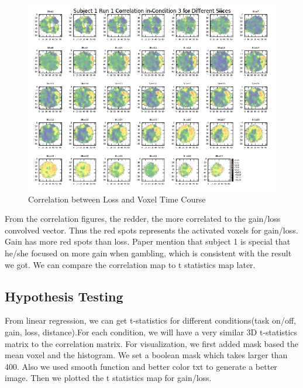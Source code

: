\begin{figure}[H]
    \centering
        \includegraphics[scale=0.5]{../plots/correlation_s1r1c3.png}
    \caption{Correlation between Loss and Voxel Time Course}
\end{figure}
\noindent
From the correlation figures, the redder, the more correlated to the gain/loss convolved vector. Thus the red spots represents the activated voxels for gain/loss. Gain has more red spots than loss. Paper mention that subject 1 is special that he/she focused on more gain when gambling, which is consistent with the result we got. We can compare the correlation map to t statistics map later.


\subsection{Hypothesis Testing}
From linear regression, we can get t-statistics for different conditions(task on/off, gain, loss, distance).For each condition, we will have a very similar 3D t-statistics matrix to the correlation matrix. For visualization, we first added mask based the mean voxel and the histogram. We set a boolean mask which takes larger than 400. Also we used smooth function and better color txt to generate a better image. Then we plotted the t statistics map for gain/loss.


